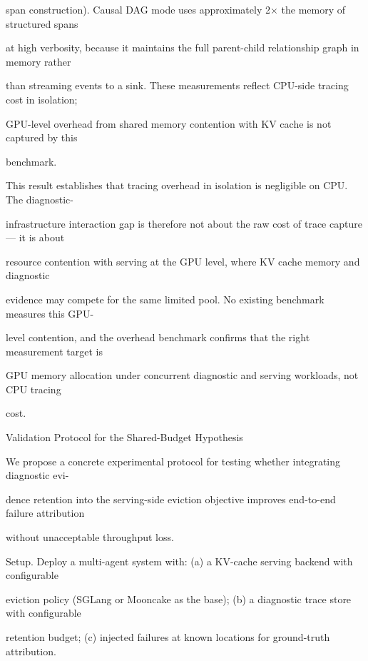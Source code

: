\begin{flushleft}
\noindent span construction). Causal DAG mode uses approximately 2× the memory of structured spans\par
\noindent at high verbosity, because it maintains the full parent-child relationship graph in memory rather\par
\noindent than streaming events to a sink. These measurements reflect CPU-side tracing cost in isolation;\par
\noindent GPU-level overhead from shared memory contention with KV cache is not captured by this\par
\noindent benchmark.\par
\noindent  This result establishes that tracing overhead in isolation is negligible on CPU. The diagnostic-\par
\noindent infrastructure interaction gap is therefore not about the raw cost of trace capture — it is about\par
\noindent resource contention with serving at the GPU level, where KV cache memory and diagnostic\par
\noindent evidence may compete for the same limited pool. No existing benchmark measures this GPU-\par
\noindent level contention, and the overhead benchmark confirms that the right measurement target is\par
\noindent GPU memory allocation under concurrent diagnostic and serving workloads, not CPU tracing\par
\noindent cost.\par
\par\smallskip
{} Validation Protocol for the Shared-Budget Hypothesis\par
\noindent We propose a concrete experimental protocol for testing whether integrating diagnostic evi-\par
\noindent dence retention into the serving-side eviction objective improves end-to-end failure attribution\par
\noindent without unacceptable throughput loss.\par
\par\smallskip
\noindent Setup. Deploy a multi-agent system with: (a) a KV-cache serving backend with configurable\par
\noindent eviction policy (SGLang or Mooncake as the base); (b) a diagnostic trace store with configurable\par
\noindent retention budget; (c) injected failures at known locations for ground-truth attribution.\par

\end{flushleft}
